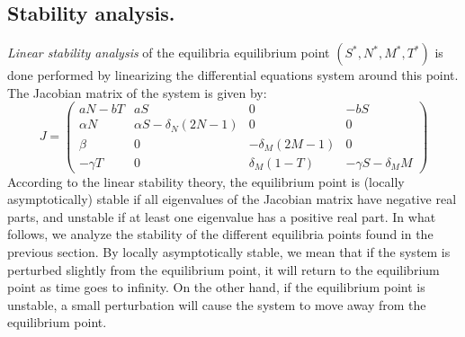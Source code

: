 \documentclass[a4paper, 12pt]{article}
\providecommand{\DIFaddtex}[1]{{\protect\color{blue} \sf #1}} %
\providecommand{\DIFdeltex}[1]{{\protect\color{red} \scriptsize #1}} %
\providecommand{\DIFaddbegin}{} %
\providecommand{\DIFaddend}{} %
\providecommand{\DIFdelbegin}{} %
\providecommand{\DIFdelend}{} %
\providecommand{\DIFadd}[1]{\texorpdfstring{\DIFaddtex{#1}}{#1}} %
\providecommand{\DIFdel}[1]{\texorpdfstring{\DIFdeltex{#1}}{}} %
\begin{document}
\subsection{Stability analysis.}
\emph{Linear stability analysis} of the \DIFdelbegin \DIFdel{equilibria }\DIFdelend \DIFaddbegin \DIFadd{equilibrium }\DIFaddend point $ (S^*, N^*, M^*, T^*)$ is \DIFdelbegin \DIFdel{done }\DIFdelend \DIFaddbegin \DIFadd{performed }\DIFaddend by linearizing the \DIFaddbegin \DIFadd{differential equations }\DIFaddend system around this point.
The Jacobian matrix of the system is given by:
\[
J = \begin{pmatrix}
aN - bT & aS & 0 & -bS \\
\alpha N & \alpha S - \delta_N (2N-1) & 0 & 0 \\
\beta & 0 & -\delta_M (2M-1) & 0 \\
-\gamma T & 0 & \delta_M (1-T) & -\gamma S - \delta_M M
\end{pmatrix}
\]
According to the linear stability theory, the equilibrium point is (locally asymptotically) stable if all eigenvalues of the Jacobian matrix have negative real parts, and unstable if at least one eigenvalue has a positive real part. In what follows,
 we analyze the stability of the different equilibria points found in the previous section. By locally asymptotically stable, we mean that if the system is perturbed slightly from the equilibrium point, it will return to the equilibrium point as time goes to infinity. On the other hand, if the equilibrium point is unstable, a small perturbation will cause the system to move away from the equilibrium point.
\end{document}

